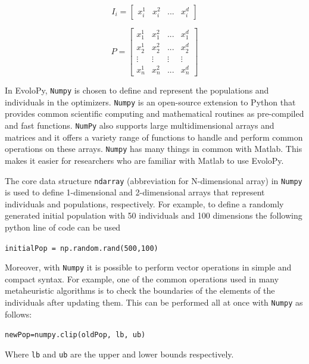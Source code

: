 \documentclass[a4paper,twoside]{article}
\begin{document}
\begin{equation}
I_{i}=[\begin{array}{cccc}
x_{i}^{1} & x_{i}^{2} & ... & x_{i}^{d}\end{array}]
\label{eq:individual}
\end{equation}

\begin{equation}
P=\left[\begin{array}{cccc}
x_{1}^{1} & x_{1}^{2} & ... & x_{1}^{d}\\
x_{2}^{1} & x_{2}^{2} & ... & x_{2}^{d}\\
\vdots & \vdots & \vdots & \vdots\\
x_{n}^{1} & x_{n}^{2} & ... & x_{n}^{d}
\end{array}\right]
\label{eq:population}
\end{equation}

In EvoloPy, \texttt{Numpy} is chosen to define and represent the populations and individuals in the optimizers. \texttt{Numpy} is an open-source extension to Python that provides common scientific computing and mathematical routines as pre-compiled and fast functions. \texttt{NumPy} also supports large multidimensional arrays and matrices and it offers a variety range of functions to handle and perform common operations on these arrays. \texttt{Numpy} has many things in common with Matlab. This makes it easier for researchers who are familiar with Matlab to use EvoloPy. 

The core data structure \texttt{ndarray} (abbreviation for N-dimensional array) in \texttt{Numpy} is used to define 1-dimensional and 2-dimensional arrays that represent individuals and populations, respectively. For example, to define a randomly generated initial population with 50 individuals and 100 dimensions the following python line of code can be used

\texttt{initialPop = np.random.rand(500,100)}


Moreover, with \texttt{Numpy} it is possible to perform vector operations in simple and compact syntax. For example, one of the common operations used in many metaheuristic algorithms is to check the boundaries of the elements of the individuals after updating them. This can be performed all at once with \texttt{Numpy} as follows:

\texttt{newPop=numpy.clip(oldPop, lb, ub)}

Where \texttt{lb} and \texttt{ub} are the upper and lower bounds respectively.
\end{document}
